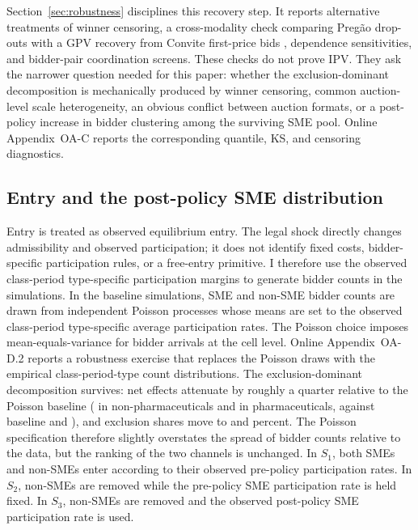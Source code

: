 Section~\ref{sec:robustness} disciplines this recovery step. It reports
alternative treatments of winner censoring, a cross-modality check comparing
Preg\~ao drop-outs with a GPV recovery from Convite first-price bids
\citep{gpv2000}, dependence sensitivities, and bidder-pair coordination
screens. These checks do not prove IPV. They ask the narrower question
needed for this paper: whether the exclusion-dominant decomposition is
mechanically produced by winner censoring, common auction-level scale
heterogeneity, an obvious conflict between auction formats, or a post-policy
increase in bidder clustering among the surviving SME pool. Online
Appendix~OA-C reports the corresponding quantile, KS, and censoring
diagnostics.

\subsection{Entry and the post-policy SME distribution}

Entry is treated as observed equilibrium entry. The legal shock directly
changes admissibility and observed participation; it does not identify
fixed costs, bidder-specific participation rules, or a free-entry
primitive. I therefore use the observed class-period type-specific
participation margins to generate bidder counts in the simulations. In
the baseline simulations, SME and non-SME bidder counts are drawn from
independent Poisson processes whose means are set to the observed
class-period type-specific average participation rates. The Poisson
choice imposes mean-equals-variance for bidder arrivals at the cell
level. Online Appendix~OA-D.2 reports a robustness exercise that
replaces the Poisson draws with the empirical class-period-type count
distributions. The exclusion-dominant decomposition survives: net
effects attenuate by roughly a quarter relative to the Poisson baseline
(\bneEffEmpTotalNp{} in non-pharmaceuticals and \bneEffEmpTotalPh{} in
pharmaceuticals, against baseline \bneEffectTotalNp{} and
\bneEffectTotalPh{}), and exclusion shares move to
\bneEffEmpShareNp{} and \bneEffEmpSharePh{} percent. The Poisson
specification therefore slightly overstates the spread of bidder counts
relative to the data, but the ranking of the two channels is unchanged. In $S_1$, both SMEs and non-SMEs enter according to
their observed pre-policy participation rates. In $S_2$, non-SMEs are
removed while the pre-policy SME participation rate is held fixed. In $S_3$,
non-SMEs are removed and the observed post-policy SME participation rate is
used.

